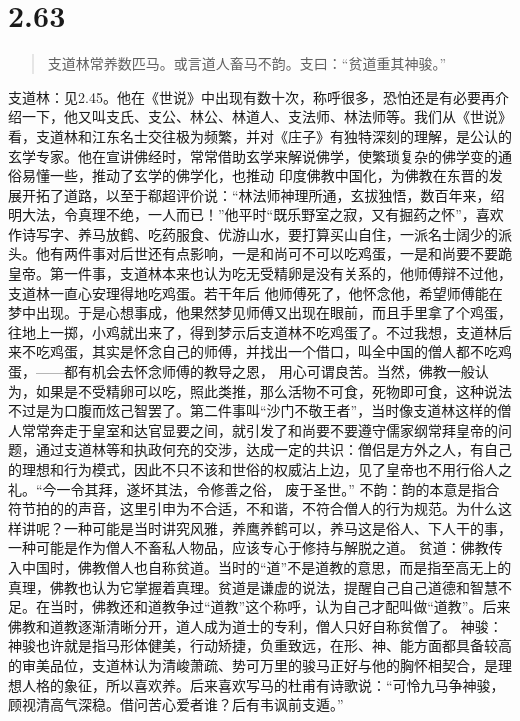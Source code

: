 \documentclass[]{book}
\begin{document}
\section{2.63}\label{section-109}

\begin{quote}
支道林常养数匹马。或言道人畜马不韵。支曰：``贫道重其神骏。''
\end{quote}

支道林：见2.45。他在《世说》中出现有数十次，称呼很多，恐怕还是有必要再介绍一下，他又叫支氏、支公、林公、林道人、支法师、林法师等。我们从《世说》看，支道林和江东名士交往极为频繁，并对《庄子》有独特深刻的理解，是公认的玄学专家。他在宣讲佛经时，常常借助玄学来解说佛学，使繁琐复杂的佛学变的通俗易懂一些，推动了玄学的佛学化，也推动
印度佛教中国化，为佛教在东晋的发展开拓了道路，以至于郗超评价说：``林法师神理所通，玄拔独悟，数百年来，绍明大法，令真理不绝，一人而已！''他平时``既乐野室之寂，又有掘药之怀''，喜欢作诗写字、养马放鹤、吃药服食、优游山水，要打算买山自住，一派名士阔少的派头。他有两件事对后世还有点影响，一是和尚可不可以吃鸡蛋，一是和尚要不要跪皇帝。第一件事，支道林本来也认为吃无受精卵是没有关系的，他师傅辩不过他，支道林一直心安理得地吃鸡蛋。若干年后
他师傅死了，他怀念他，希望师傅能在梦中出现。于是心想事成，他果然梦见师傅又出现在眼前，而且手里拿了个鸡蛋，往地上一掷，小鸡就出来了，得到梦示后支道林不吃鸡蛋了。不过我想，支道林后来不吃鸡蛋，其实是怀念自己的师傅，并找出一个借口，叫全中国的僧人都不吃鸡蛋，------都有机会去怀念师傅的教导之恩，
用心可谓良苦。当然，佛教一般认为，如果是不受精卵可以吃，照此类推，那么活物不可食，死物即可食，这种说法不过是为口腹而炫己智罢了。第二件事叫``沙门不敬王者''，当时像支道林这样的僧人常常奔走于皇室和达官显要之间，就引发了和尚要不要遵守儒家纲常拜皇帝的问题，通过支道林等和执政何充的交涉，达成一定的共识：僧侣是方外之人，有自己的理想和行为模式，因此不只不该和世俗的权威沾上边，见了皇帝也不用行俗人之礼。``今一令其拜，遂坏其法，令修善之俗，
废于圣世。''
不韵：韵的本意是指合符节拍的的声音，这里引申为不合适，不和谐，不符合僧人的行为规范。为什么这样讲呢？一种可能是当时讲究风雅，养鹰养鹤可以，养马这是俗人、下人干的事，一种可能是作为僧人不畜私人物品，应该专心于修持与解脱之道。
贫道：佛教传入中国时，佛教僧人也自称贫道。当时的``道''不是道教的意思，而是指至高无上的真理，佛教也认为它掌握着真理。贫道是谦虚的说法，提醒自己自己道德和智慧不足。在当时，佛教还和道教争过``道教''这个称呼，认为自己才配叫做``道教''。后来佛教和道教逐渐清晰分开，道人成为道士的专利，僧人只好自称贫僧了。
神骏：神骏也许就是指马形体健美，行动矫捷，负重致远，在形、神、能方面都具备较高的审美品位，支道林认为清峻萧疏、势可万里的骏马正好与他的胸怀相契合，是理想人格的象征，所以喜欢养。后来喜欢写马的杜甫有诗歌说：``可怜九马争神骏，顾视清高气深稳。借问苦心爱者谁？后有韦讽前支遁。''
\end{document}
